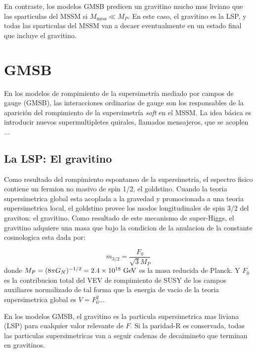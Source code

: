 En contraste, los modelos GMSB predicen un gravitino mucho mas
liviano que las sparticulas del MSSM si $M_\text{mess} \ll M_P$.
En este caso, el gravitino es la LSP, y todas las sparticulas
del MSSM van a decaer eventualmente en un estado final que incluye
el gravitino.








\section{GMSB} %


En los modelos de rompimiento de la supersimetría mediado por campos de gauge
(GMSB), las interacciones ordinarias de gauge son los responsables de la
aparición del rompimiento de la supersimetría \emph{soft} en el MSSM.
La idea básica es introducir
nuevos supermultipletes quirales, llamados mensajeros, que se acoplen ...


\subsection{La LSP: El gravitino}

Como resultado del rompimiento espontaneo de la supersimetria, el espectro fisico
contiene un fermion no masivo de spin 1/2, el goldstino. Cuando la teoria supersimetrica
global esta acoplada a la gravedad y promocionada a una teoria supersimetrica local,
el goldstino provee los modos longitudinales de spin 3/2 del graviton: el gravitino.
Como resultado de este mecanismo de super-Higgs, el gravitino adquiere una masa
que bajo la condicion de la anulacion de la constante cosmologica esta dada por:

\begin{equation}
  m_{3/2} = \frac{F_0}{\sqrt{3}M_P}
\end{equation}
%
donde $M_P = (8\pi G_N)^{-1/2} = 2.4 \times 10^{18} \gev$ es la masa reducida de Planck.
Y $F_0$ es la contribucion total del VEV de rompimiento de SUSY de los campos auxiliares
normalizado de tal forma que la energia de vacio de la teoria supersimetrica global es
$V = F_0^2$...

En los modelos GMSB, el gravitino es la particula supersimetrica mas liviana (LSP) para
cualquier valor relevante de $F$. Si la paridad-R es conservada, todas las particulas
supersimetricas van a seguir cadenas de decaimineto que terminan en gravitinos.

